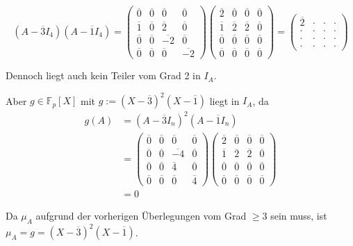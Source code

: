 \documentclass[a4paper,12pt]{article}
\begin{document}
\[
(A - \overline{3}I_4)(A - \overline{1}I_4) =
\begin{pmatrix}
  \overline{0} & \overline{0} & \overline{0}  & \overline{0} \\
  \overline{1} & \overline{0} & \overline{2}  & \overline{0} \\
  \overline{0} & \overline{0} & \overline{-2} & \overline{0} \\
  \overline{0} & \overline{0} & \overline{0}  & \overline{-2}
\end{pmatrix}
\begin{pmatrix}
  \overline{2} & \overline{0} & \overline{0} & \overline{0} \\
  \overline{1} & \overline{2} & \overline{2} & \overline{0} \\
  \overline{0} & \overline{0} & \overline{0} & \overline{0} \\
  \overline{0} & \overline{0} & \overline{0} & \overline{0}
\end{pmatrix}
= \begin{pmatrix}
  \overline{2} & \cdot & \cdot & \cdot \\
  \cdot & \cdot & \cdot & \cdot \\
  \cdot & \cdot & \cdot & \cdot \\
  \cdot & \cdot & \cdot & \cdot
\end{pmatrix}
\]

Dennoch liegt auch kein Teiler vom Grad 2 in $I_A$.

Aber $g \in \mathbb{F}_p[X]$ mit $g := (X-\overline{3})^2 (X-\overline{1})$ liegt in $I_A$, da
\begin{align*}
g(A) &= (A - \overline{3}I_n)^2 (A - \overline{1}I_n) \\
     &= \begin{pmatrix}
       \overline{0} & \overline{0} & \overline{0}  & \overline{0} \\
       \overline{0} & \overline{0} & \overline{-4} & \overline{0} \\
       \overline{0} & \overline{0} & \overline{4}  & \overline{0} \\
       \overline{0} & \overline{0} & \overline{0}  & \overline{4}
     \end{pmatrix}
     \begin{pmatrix}
       \overline{2} & \overline{0} & \overline{0} & \overline{0} \\
       \overline{1} & \overline{2} & \overline{2} & \overline{0} \\
       \overline{0} & \overline{0} & \overline{0} & \overline{0} \\
       \overline{0} & \overline{0} & \overline{0} & \overline{0}
     \end{pmatrix} \\
     &= 0
\end{align*}

Da $\mu_A$ aufgrund der vorherigen Überlegungen vom Grad $\geq 3$ sein muss, ist $\mu_A = g = (X-\overline{3})^2 (X-\overline{1})$.
\end{document}
